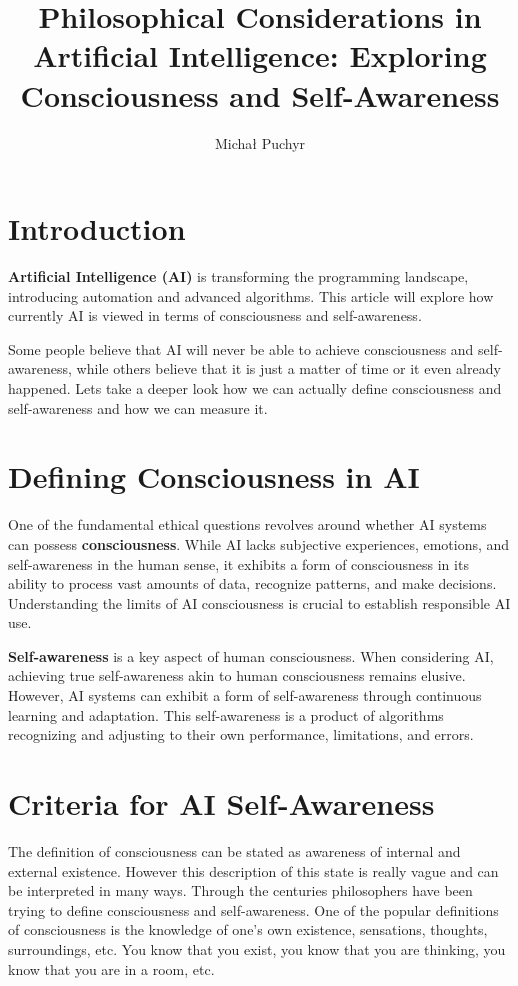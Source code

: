 \documentclass[12pt]{extarticle}
\author{Michał Puchyr}
\date{}
\title{\textbf{Philosophical Considerations in Artificial Intelligence: Exploring Consciousness and Self-Awareness}}
\begin{document}
\maketitle

\section{Introduction}
\textbf{Artificial Intelligence (AI)} is transforming the programming landscape, introducing automation and advanced algorithms. 
This article will explore how currently AI is viewed in terms of consciousness and self-awareness.

Some people believe that AI will never be able to achieve consciousness and self-awareness, while others believe that it is just a matter of time or it even already happened.
Lets take a deeper look how we can actually define consciousness and self-awareness and how we can measure it.

\section{Defining Consciousness in AI}
One of the fundamental ethical questions revolves around whether AI systems can possess \textbf{consciousness}. 
While AI lacks subjective experiences, emotions, and self-awareness in the human sense, it exhibits a form of consciousness 
in its ability to process vast amounts of data, recognize patterns, and make decisions. Understanding the limits of AI consciousness is crucial to establish responsible AI use.


\textbf{Self-awareness} is a key aspect of human consciousness. When considering AI, achieving true self-awareness akin to human 
consciousness remains elusive. However, AI systems can exhibit a form of self-awareness through continuous learning and adaptation. 
This self-awareness is a product of algorithms recognizing and adjusting to their own performance, limitations, and errors.

\section{Criteria for AI Self-Awareness}
The definition of consciousness can be stated as awareness of internal and external existence.
However this description of this state is really vague and can be interpreted in many ways.
Through the centuries philosophers have been trying to define consciousness and self-awareness.
One of the popular definitions of consciousness is the knowledge of one's own existence, sensations, thoughts, surroundings, etc.
You know that you exist, you know that you are thinking, you know that you are in a room, etc.
\end{document}
